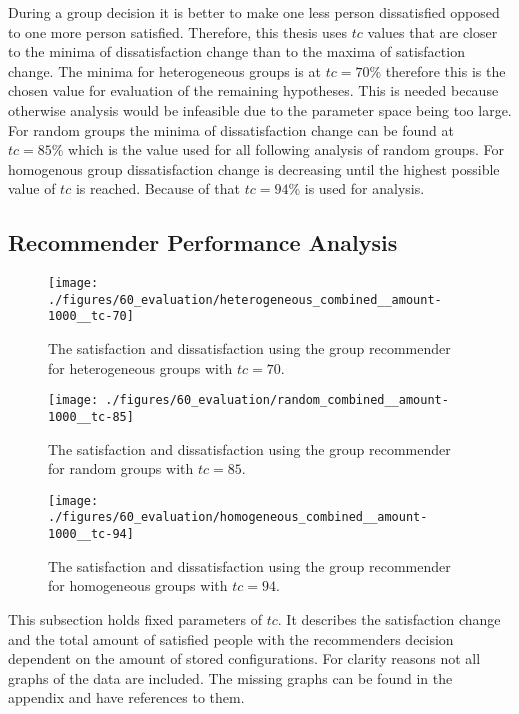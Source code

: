 During a group decision it is better to make one less person dissatisfied opposed to one more person satisfied. Therefore, this thesis uses $tc$ values that are closer to the minima of dissatisfaction change than to the maxima of satisfaction change. The minima for heterogeneous groups is at $tc = 70\%$ therefore this is the chosen value for evaluation of the remaining hypotheses. This is needed because otherwise analysis would be infeasible due to the parameter space being too large. For random groups the minima of dissatisfaction change can be found at $tc = 85\%$ which is the value used for all following analysis of random groups. For homogenous group dissatisfaction change is decreasing until the highest possible value of $tc$ is reached. Because of that $tc = 94\%$ is used for analysis.

\subsection{Recommender Performance Analysis}

\begin{figure}[p]
    \centering
    \texttt{[image: ./figures/60\_evaluation/heterogeneous\_combined\_\_amount-1000\_\_tc-70]}
    \caption{The satisfaction and dissatisfaction using the group recommender for heterogeneous groups with $tc = 70$.}
    \label{fig:Evaluation:HeteroSatisfaction}
\end{figure}

\begin{figure}[p]
    \centering
    \texttt{[image: ./figures/60\_evaluation/random\_combined\_\_amount-1000\_\_tc-85]}
    \caption{The satisfaction and dissatisfaction using the group recommender for random groups with $tc = 85$.}
    \label{fig:Evaluation:RandomSatisfaction}
\end{figure}

\begin{figure}[p]
    \centering
    \texttt{[image: ./figures/60\_evaluation/homogeneous\_combined\_\_amount-1000\_\_tc-94]}
    \caption{The satisfaction and dissatisfaction using the group recommender for homogeneous groups with $tc = 94$.}
    \label{fig:Evaluation:HomoSatisfaction}
\end{figure}

This subsection holds fixed parameters of $tc$. It describes the satisfaction change and the total amount of satisfied people with the recommenders decision dependent on the amount of stored configurations. For clarity reasons not all graphs of the data are included. The missing graphs can be found in the appendix and have references to them.

